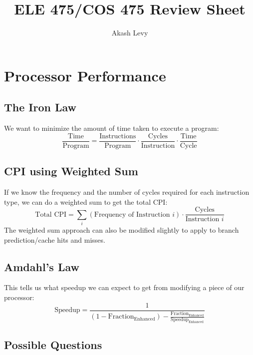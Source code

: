 \documentclass{article}
\title{ELE 475/COS 475 Review Sheet}
\author{Akash Levy}
\begin{document}
\maketitle

\section{Processor Performance}

\subsection{The Iron Law}

We want to minimize the amount of time taken to execute a program:
$$ \frac{\text{Time}}{\text{Program}} = \frac{\text{Instructions}}{\text{Program}} \cdot \frac{\text{Cycles}}{\text{Instruction}} \cdot \frac{\text{Time}}{\text{Cycle}} $$

\subsection{CPI using Weighted Sum}

If we know the frequency and the number of cycles required for each instruction type, we can do a weighted sum to get the total CPI:
$$ \text{Total CPI} = \sum_i (\text{Frequency of Instruction } i) \cdot \frac{\text{Cycles}}{\text{Instruction } i} $$
The weighted sum approach can also be modified slightly to apply to branch prediction/cache hits and misses.

\subsection{Amdahl's Law}

This tells us what speedup we can expect to get from modifying a piece of our processor:
$$ \text{Speedup} = \frac{1}{(1 - \text{Fraction}_{\text{Enhanced}})-\frac{\text{Fraction}_{\text{Enhanced}}}{\text{Speedup}_{\text{Enhanced}}}} $$

\subsection{Possible Questions}
\end{document}
